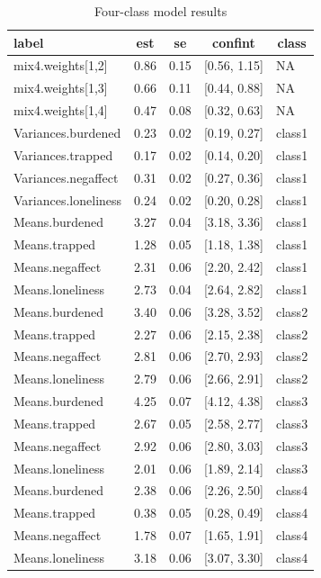 \documentclass[
  man,floatsintext]{apa6}
\begin{document}
\begin{table}[tbp]

\begin{center}
\begin{threeparttable}

\caption{\label{tab:unnamed-chunk-13}Four-class model results}

\begin{tabular}{lllll}
\toprule
label & \multicolumn{1}{c}{est} & \multicolumn{1}{c}{se} & \multicolumn{1}{c}{confint} & \multicolumn{1}{c}{class}\\
\midrule
mix4.weights[1,2] & 0.86 & 0.15 & {}[0.56, 1.15] & NA\\
mix4.weights[1,3] & 0.66 & 0.11 & {}[0.44, 0.88] & NA\\
mix4.weights[1,4] & 0.47 & 0.08 & {}[0.32, 0.63] & NA\\
Variances.burdened & 0.23 & 0.02 & {}[0.19, 0.27] & class1\\
Variances.trapped & 0.17 & 0.02 & {}[0.14, 0.20] & class1\\
Variances.negaffect & 0.31 & 0.02 & {}[0.27, 0.36] & class1\\
Variances.loneliness & 0.24 & 0.02 & {}[0.20, 0.28] & class1\\
Means.burdened & 3.27 & 0.04 & {}[3.18, 3.36] & class1\\
Means.trapped & 1.28 & 0.05 & {}[1.18, 1.38] & class1\\
Means.negaffect & 2.31 & 0.06 & {}[2.20, 2.42] & class1\\
Means.loneliness & 2.73 & 0.04 & {}[2.64, 2.82] & class1\\
Means.burdened & 3.40 & 0.06 & {}[3.28, 3.52] & class2\\
Means.trapped & 2.27 & 0.06 & {}[2.15, 2.38] & class2\\
Means.negaffect & 2.81 & 0.06 & {}[2.70, 2.93] & class2\\
Means.loneliness & 2.79 & 0.06 & {}[2.66, 2.91] & class2\\
Means.burdened & 4.25 & 0.07 & {}[4.12, 4.38] & class3\\
Means.trapped & 2.67 & 0.05 & {}[2.58, 2.77] & class3\\
Means.negaffect & 2.92 & 0.06 & {}[2.80, 3.03] & class3\\
Means.loneliness & 2.01 & 0.06 & {}[1.89, 2.14] & class3\\
Means.burdened & 2.38 & 0.06 & {}[2.26, 2.50] & class4\\
Means.trapped & 0.38 & 0.05 & {}[0.28, 0.49] & class4\\
Means.negaffect & 1.78 & 0.07 & {}[1.65, 1.91] & class4\\
Means.loneliness & 3.18 & 0.06 & {}[3.07, 3.30] & class4\\
\bottomrule
\end{tabular}

\end{threeparttable}
\end{center}

\end{table}
\end{document}
